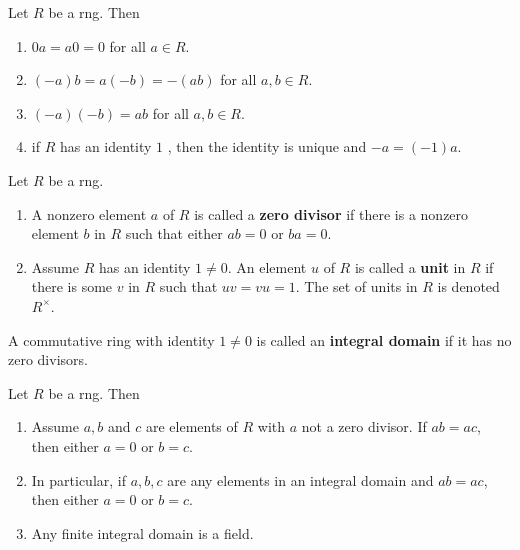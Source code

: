 \begin{proposition}
    Let $R$ be a rng. Then
    \begin{enumerate}
        \item
              $0 a=a 0=0$ for all $a \in R$.
        \item  $(-a) b=a(-b)=-(a b)$ for all $a, b \in R$.
        \item
              $(-a)(-b)=a b$ for all $a, b \in R$.
        \item
              if $R$ has an identity $1$ , then the identity is unique and $-a=(-1) a$.
    \end{enumerate}
\end{proposition}


\begin{definition}
    Let $R$ be a rng.
    \begin{enumerate}
        \item  A nonzero element $a$ of $R$ is called a \textbf{zero divisor} if there is a nonzero element $b$ in $R$ such that either $a b=0$ or $b a=0$.

        \item Assume $R$ has an identity $1 \neq 0$. An element $u$ of $R$ is called a \textbf{unit} in $R$ if there is some $v$ in $R$ such that $u v=v u=1$. The set of units in $R$ is denoted $R^{\times}$.
    \end{enumerate}
\end{definition}


\begin{definition} %
    A commutative ring with identity $1 \neq 0$ is called an \textbf{integral domain} if it has no zero divisors.
\end{definition}

\begin{proposition} %
    Let $R$ be a rng. Then
    \begin{enumerate}
        \item  Assume $a, b$ and $c$ are elements of $R$ with $a$ not a zero divisor. If $a b=a c$, then either $a=0$ or $b=c$.

        \item In particular, if $a, b, c$ are any elements in an integral domain and $a b=a c$, then either $a=0$ or $b=c$.

        \item Any finite integral domain is a field.
    \end{enumerate}
\end{proposition}




